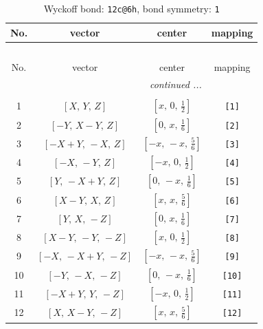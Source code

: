 \documentclass[fleqn,8pt]{jsarticle}
\begin{document}
\begin{longtable}{cccc}
\caption{Wyckoff bond: {\tt 12c@6h}, bond symmetry: {\tt 1}}
 \\
 \hline \hline
No. & vector & center & mapping \\ \hline \endfirsthead

\multicolumn{3}{l}{\tablename\ \thetable{}} \\
 \hline \hline
No. & vector & center & mapping \\ \hline \endhead

 \hline \hline
\multicolumn{3}{r}{\footnotesize\it continued ...} \\ \endfoot

 \hline \hline
\multicolumn{3}{r}{} \\ \endlastfoot

1 & $\left[ X,\, Y,\, Z \right]$ & $\left[ x,\, 0,\, \frac{1}{2} \right]$ & {\tt [1]} \\ \hline
2 & $\left[ - Y,\, X - Y,\, Z \right]$ & $\left[ 0,\, x,\, \frac{1}{6} \right]$ & {\tt [2]} \\ \hline
3 & $\left[ - X + Y,\, - X,\, Z \right]$ & $\left[ - x,\, - x,\, \frac{5}{6} \right]$ & {\tt [3]} \\ \hline
4 & $\left[ - X,\, - Y,\, Z \right]$ & $\left[ - x,\, 0,\, \frac{1}{2} \right]$ & {\tt [4]} \\ \hline
5 & $\left[ Y,\, - X + Y,\, Z \right]$ & $\left[ 0,\, - x,\, \frac{1}{6} \right]$ & {\tt [5]} \\ \hline
6 & $\left[ X - Y,\, X,\, Z \right]$ & $\left[ x,\, x,\, \frac{5}{6} \right]$ & {\tt [6]} \\ \hline
7 & $\left[ Y,\, X,\, - Z \right]$ & $\left[ 0,\, x,\, \frac{1}{6} \right]$ & {\tt [7]} \\ \hline
8 & $\left[ X - Y,\, - Y,\, - Z \right]$ & $\left[ x,\, 0,\, \frac{1}{2} \right]$ & {\tt [8]} \\ \hline
9 & $\left[ - X,\, - X + Y,\, - Z \right]$ & $\left[ - x,\, - x,\, \frac{5}{6} \right]$ & {\tt [9]} \\ \hline
10 & $\left[ - Y,\, - X,\, - Z \right]$ & $\left[ 0,\, - x,\, \frac{1}{6} \right]$ & {\tt [10]} \\ \hline
11 & $\left[ - X + Y,\, Y,\, - Z \right]$ & $\left[ - x,\, 0,\, \frac{1}{2} \right]$ & {\tt [11]} \\ \hline
12 & $\left[ X,\, X - Y,\, - Z \right]$ & $\left[ x,\, x,\, \frac{5}{6} \right]$ & {\tt [12]} \\
\end{longtable}
\end{document}
